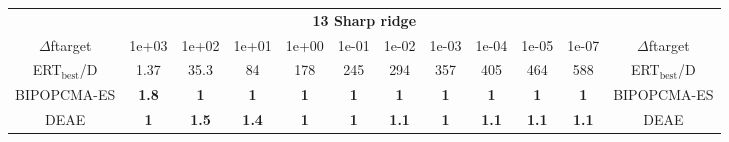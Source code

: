 \begin{tabular}{cccccccccccc}
 & \multicolumn{10}{c}{{\normalsize \textbf{13 Sharp ridge}}}\\
$\Delta$ftarget& 1e+03& 1e+02& 1e+01& 1e+00& 1e-01& 1e-02& 1e-03& 1e-04& 1e-05& 1e-07 & $\Delta$ftarget \\
ERT$_{\textrm{best}}$/D& 1.37& 35.3& 84& 178& 245& 294& 357& 405& 464& 588 & ERT$_{\textrm{best}}$/D \\
\hline
BIPOPCMA-ES & \textbf{1.8} & \textbf{1} & \textbf{1} & \textbf{1} & \textbf{1} & \textbf{1} & \textbf{1} & \textbf{1} & \textbf{1} & \textbf{1} & BIPOPCMA-ES \cite{add_an_entry_for_BIPOPCMA-ES_in_bbob.bib}\\
DEAE & \textbf{1} & \textbf{1.5} & \textbf{1.4} & \textbf{1} & \textbf{1} & \textbf{1.1} & \textbf{1} & \textbf{1.1} & \textbf{1.1} & \textbf{1.1} & DEAE \cite{add_an_entry_for_DEAE_in_bbob.bib}
\end{tabular}
